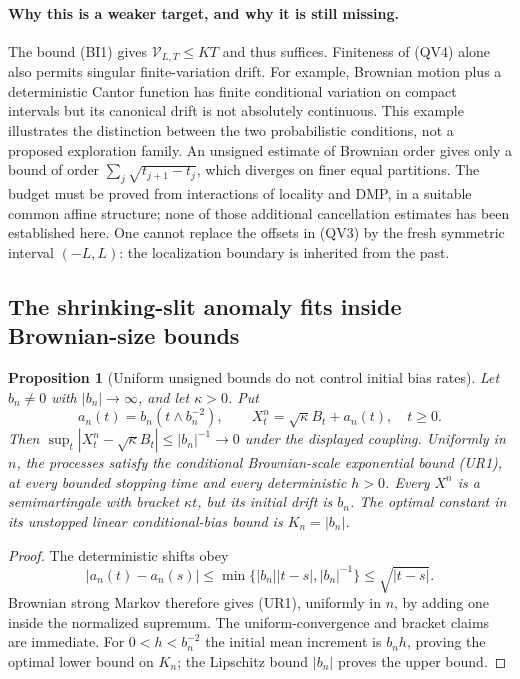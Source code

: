 \documentclass[11pt]{article}
\newtheorem{proposition}[theorem]{Proposition}
\theoremstyle{definition}\newtheorem{definition}[theorem]{Definition}
\theoremstyle{remark}\newtheorem{remark}[theorem]{Remark}
\begin{document}
\paragraph{Why this is a weaker target, and why it is still missing.}
The bound (BI1) gives $\mathcal V_{L,T}\le KT$ and thus suffices. Finiteness
of (QV4) alone also permits singular finite-variation drift. For example,
Brownian motion plus a deterministic Cantor function has finite conditional
variation on compact intervals but its canonical drift is not absolutely
continuous. This example illustrates the distinction between the two
probabilistic conditions, not a proposed exploration family.
An unsigned estimate of Brownian order gives only a bound of order
$\sum_j\sqrt{t_{j+1}-t_j}$, which diverges on finer equal partitions.
The budget must be proved from interactions of locality and DMP, in a
suitable common affine structure; none of those additional cancellation
estimates has been established here. One cannot replace the offsets in
(QV3) by the fresh symmetric interval $(-L,L)$: the localization boundary
is inherited from the past.

\subsection{The shrinking-slit anomaly fits inside Brownian-size bounds}
\label{sec:slit-pulse-obstruction}

\begin{proposition}[Uniform unsigned bounds do not control initial bias rates]
\label{prop:slit-pulse}
Let $b_n\ne0$ with $|b_n|\to\infty$, and let $\kappa>0$. Put
\[
 a_n(t)=b_n(t\wedge b_n^{-2}),\qquad
 X^n_t=\sqrt\kappa B_t+a_n(t),\quad t\ge0.
 \tag{SP1}
\]
Then $\sup_t|X^n_t-\sqrt\kappa B_t|\le|b_n|^{-1}\to0$ under the displayed
coupling. Uniformly in $n$, the processes satisfy the conditional
Brownian-scale exponential bound (UR1), at every bounded stopping time
and every deterministic $h>0$. Every $X^n$ is a semimartingale with
bracket $\kappa t$, but its initial drift is $b_n$. The optimal constant
in its unstopped linear conditional-bias bound is $K_n=|b_n|$.
\end{proposition}
\begin{proof}
The deterministic shifts obey
\[
 |a_n(t)-a_n(s)|
 \le\min\{|b_n||t-s|,|b_n|^{-1}\}\le\sqrt{|t-s|}.
 \tag{SP2}
\]
Brownian strong Markov therefore gives (UR1), uniformly in $n$, by adding
one inside the normalized supremum. The uniform-convergence and bracket
claims are immediate. For $0<h<b_n^{-2}$ the initial mean increment is
$b_nh$, proving the optimal lower bound on $K_n$; the Lipschitz bound
$|b_n|$ proves the upper bound.
\end{proof}
\end{document}
